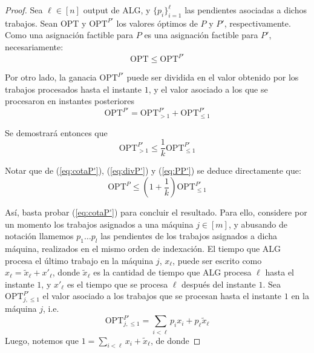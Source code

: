 \documentclass[10pt]{article}
\theoremstyle{plain}
\theoremstyle{definition}
\begin{document}
\begin{proof}
Sea $\ell \in [n]$ output de ALG, y $\{p_i\}_{i=1}^\ell$ las pendientes asociadas a dichos trabajos. Sean OPT y $\text{OPT}^{P'}$ los valores óptimos de $P$ y $P'$, respectivamente. Como una asignación factible para $P$ es una asignación factible para $P'$, necesariamente:
\begin{equation}
\label{eq:PP'}
\text{OPT} \leq \text{OPT}^{P'}
\end{equation}

Por otro lado, la ganacia $\text{OPT}^{P'}$ puede ser dividida en el valor obtenido por los trabajos procesados hasta el instante $1$, y el valor asociado a los que se procesaron en instantes posteriores
\begin{equation}
\label{eq:divP'}
\text{OPT}^{P'} = \text{OPT}^{P'}_{>1} + \text{OPT}^{P'}_{\leq 1}
\end{equation}

Se demostrar\'a entonces que
\begin{equation}
\label{eq:cotaP'}
\text{OPT}^{P'}_{>1} \leq \frac{1}{k}\text{OPT}^{P'}_{\leq 1}
\end{equation}

Notar que de (\ref{eq:cotaP'}), (\ref{eq:divP'}) y (\ref{eq:PP'}) se deduce directamente que:
\begin{equation*}
\text{OPT}^P \leq \left( 1 + \frac{1}{k} \right)\text{OPT}^{P'}_{\leq 1}
\end{equation*}

Así, basta probar (\ref{eq:cotaP'}) para concluir el resultado. Para ello, considere por un momento los trabajos asignados a una máquina $j \in [m]$, y abusando de notación llamemos $p_1 \ldots p_l$ las pendientes de los trabajos asignados a dicha máquina, realizados en el mismo orden de indexación. El tiempo que ALG procesa el último trabajo en la máquina $j$, $x_\ell$, puede ser escrito como $x_\ell = \tilde{x}_\ell + x'_\ell$, donde $\tilde{x}_\ell$ es la cantidad de tiempo que ALG procesa $\ell$ hasta el instante $1$, y $x'_\ell$ es el tiempo que se procesa $\ell$ después del instante $1$. Sea $\text{OPT}^{P'}_{j,\leq 1}$ el valor asociado a los trabajos que se procesan hasta el instante $1$ en la máquina $j$, i.e.
\begin{equation}
\label{eq:ganjP}
\text{OPT}^{P'}_{j,\leq 1} = \sum_{i <\ell} p_i x_i + p_\ell \tilde{x}_\ell
\end{equation} 
Luego, notemos que $1 = \sum_{i<\ell} x_i + \tilde{x}_{\ell}$, de donde


\end{proof}
\end{document}
